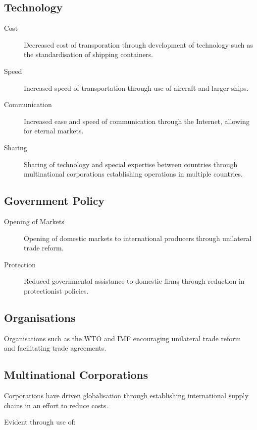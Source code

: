 \documentclass[a4paper,11pt]{article}
\begin{document}
\subsection{Technology}

\begin{description}
\item [Cost] Decreased cost of transporation through development of technology
	such as the standardisation of shipping containers.
\item [Speed] Increased speed of transportation through use of aircraft and
	larger ships.
\item [Communication] Increased ease and speed of communication through the
	Internet, allowing for eternal markets.
\item [Sharing] Sharing of technology and special expertise between countries
	through multinational corporations establishing operations in multiple
	countries.
\end{description}



\subsection{Government Policy}

\begin{description}
\item [Opening of Markets] Opening of domestic markets to international
	producers through unilateral trade reform.
\item [Protection] Reduced governmental assistance to domestic firms through
	reduction in protectionist policies.
\end{description}


\subsection{Organisations}

Organisations such as the WTO and IMF encouraging unilateral trade reform
and facilitating trade agreements.


\subsection{Multinational Corporations}

Corporations have driven globalisation through establishing international
supply chains in an effort to reduce costs.

Evident through use of:
\end{document}
